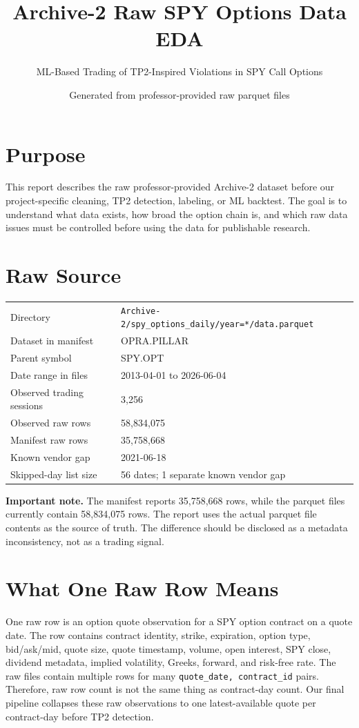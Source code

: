 \documentclass[11pt]{article}
\title{Archive-2 Raw SPY Options Data EDA}
\author{ML-Based Trading of TP2-Inspired Violations in SPY Call Options}
\date{Generated from professor-provided raw parquet files}
\begin{document}
\maketitle

\section*{Purpose}

This report describes the raw professor-provided Archive-2 dataset before our
project-specific cleaning, TP2 detection, labeling, or ML backtest. The goal is
to understand what data exists, how broad the option chain is, and which raw
data issues must be controlled before using the data for publishable research.

\section*{Raw Source}

\begin{tabular}{ll}
\toprule
Directory & \texttt{Archive-2/spy\_options\_daily/year=*/data.parquet} \\
Dataset in manifest & OPRA.PILLAR \\
Parent symbol & SPY.OPT \\
Date range in files & 2013-04-01 to 2026-06-04 \\
Observed trading sessions & 3,256 \\
Observed raw rows & 58,834,075 \\
Manifest raw rows & 35,758,668 \\
Known vendor gap & 2021-06-18 \\
Skipped-day list size & 56 dates; 1 separate known vendor gap \\
\bottomrule
\end{tabular}

\textbf{Important note.} The manifest reports 35,758,668 rows, while the parquet files currently contain 58,834,075 rows. The report uses the actual parquet
file contents as the source of truth. The difference should be disclosed as a
metadata inconsistency, not as a trading signal.

\section*{What One Raw Row Means}

One raw row is an option quote observation for a SPY option contract on a quote
date. The row contains contract identity, strike, expiration, option type,
bid/ask/mid, quote size, quote timestamp, volume, open interest, SPY close,
dividend metadata, implied volatility, Greeks, forward, and risk-free rate.
The raw files contain multiple rows for many \texttt{quote\_date,
contract\_id} pairs. Therefore, raw row count is not the same thing as
contract-day count. Our final pipeline collapses these raw observations to one
latest-available quote per contract-day before TP2 detection.
\end{document}
